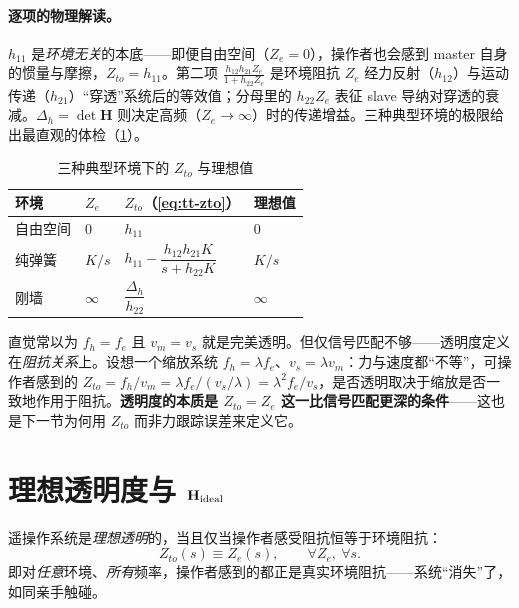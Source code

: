 \paragraph{逐项的物理解读。}
$h_{11}$ 是\emph{环境无关}的本底——即便自由空间（$Z_e=0$），操作者也会感到 master 自身的惯量与摩擦，$Z_{to}=h_{11}$。第二项 $\tfrac{h_{12}h_{21}Z_e}{1+h_{22}Z_e}$ 是环境阻抗 $Z_e$ 经力反射（$h_{12}$）与运动传递（$h_{21}$）“穿透”系统后的等效值；分母里的 $h_{22}Z_e$ 表征 slave 导纳对穿透的衰减。$\Delta_h=\det\mathbf H$ 则决定高频（$Z_e\to\infty$）时的传递增益。三种典型环境的极限给出最直观的体检（\cref{tab:tt-zto-cases}）。

\begin{table}[H]\centering\small
\caption{三种典型环境下的 $Z_{to}$ 与理想值}
\label{tab:tt-zto-cases}
\begin{tabular}{llll}
\toprule
环境 & $Z_e$ & $Z_{to}$（\cref{eq:tt-zto}） & 理想值 \\
\midrule
自由空间 & $0$ & $h_{11}$ & $0$ \\[2pt]
纯弹簧 & $K/s$ & $h_{11}-\dfrac{h_{12}h_{21}K}{s+h_{22}K}$ & $K/s$ \\[6pt]
刚墙 & $\infty$ & $\dfrac{\Delta_h}{h_{22}}$ & $\infty$ \\
\bottomrule
\end{tabular}
\end{table}

\begin{pitfall}[概念误区：“力和速度都跟得上 = 透明”]
直觉常以为 $f_h=f_e$ 且 $v_m=v_s$ 就是完美透明。但仅信号匹配不够——透明度定义在\emph{阻抗关系}上。设想一个缩放系统 $f_h=\lambda f_e$、$v_s=\lambda v_m$：力与速度都“不等”，可操作者感到的 $Z_{to}=f_h/v_m=\lambda f_e/(v_s/\lambda)=\lambda^2 f_e/v_s$，是否透明取决于缩放是否一致地作用于阻抗。\textbf{透明度的本质是 $Z_{to}=Z_e$ 这一比信号匹配更深的条件}——这也是下一节为何用 $Z_{to}$ 而非力跟踪误差来定义它。
\end{pitfall}

\section{理想透明度与 \texorpdfstring{$\mathbf H_{\rm ideal}$}{Hideal}}
\label{sec:tt-ideal}

\begin{definition}\label{def:tt-transparency}
遥操作系统是\emph{理想透明}的，当且仅当操作者感受阻抗恒等于环境阻抗：
\begin{equation}
  Z_{to}(s)\equiv Z_e(s),\qquad \forall Z_e,\ \forall s.
  \label{eq:tt-transparency}
\end{equation}
即对\emph{任意}环境、\emph{所有}频率，操作者感到的都正是真实环境阻抗——系统“消失”了，如同亲手触碰\cite{lawrence1993stability}。
\end{definition}

